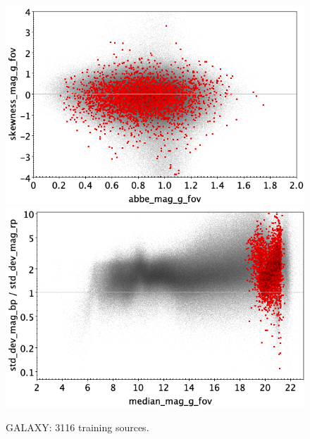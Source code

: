 \documentclass[longauth]{aa}
\begin{document}
\begin{appendix}
\begin{figure}
\vspace{4mm}
 \includegraphics[width=0.45\hsize]{figures/appendix/GALAXY_trn_ask.png}  %
\hspace{2mm}
 \includegraphics[width=0.45\hsize]{figures/appendix/GALAXY_trn_msdr.png}  \\ %
\vspace{4mm}
 \caption{GALAXY: 3116 training sources.}  
 \label{fig:app:GALAXY_trn}
\end{figure}


\end{appendix}
\end{document}
